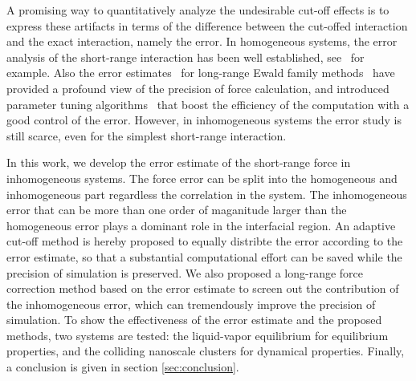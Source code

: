 \documentclass[aps,pre,preprint]{revtex4}
\begin{document}


A promising way to quantitatively analyze the undesirable cut-off
effects is to express these artifacts in terms of the difference
between the cut-offed interaction and the exact interaction, namely
the error. In homogeneous systems, the error analysis of the
short-range interaction has been well established,
see~\cite{kolafa1992cutoff} for example. Also the error
estimates~\cite{hummer1995numerical, kolafa1992cutoff,
  petersen1995accuracy, deserno1998mue2, wang2010optimizing} for
long-range Ewald family methods~\cite{ewald1921die,
  hockney1988computer, deserno1998mue1, darden1993pme, essmann1995spm}
have provided a profound view of the precision of force calculation,
and introduced parameter tuning algorithms~\cite{limbach06a,
  wang2010optimizing} that boost the efficiency of the computation
with a good control of the error. However, in inhomogeneous systems
the error study is still scarce, even for the simplest short-range
interaction.

In this work, we develop the error estimate of the short-range force
in inhomogeneous systems. The force error can be split into the
homogeneous and inhomogeneous part regardless the correlation in the
system. The inhomogeneous error that can be more than one order of
maganitude larger than the homogeneous error plays a dominant role in
the interfacial region. An adaptive cut-off method is hereby proposed
to equally distribte the error according to the error estimate, so
that a substantial computational effort can be saved while the
precision of simulation is preserved. We also proposed a long-range
force correction method based on the error estimate to screen out the
contribution of the inhomogeneous error, which can tremendously
improve the precision of simulation. To show the effectiveness of the
error estimate and the proposed methods, two systems are tested: the
liquid-vapor equilibrium for equilibrium properties, and the colliding
nanoscale clusters for dynamical properties. Finally, a conclusion is
given in section \ref{sec:conclusion}.
\end{document}
